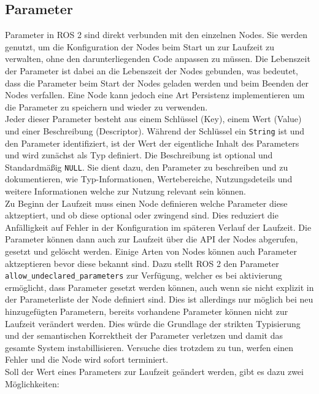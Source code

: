 \subsection{Parameter}\label{subsec:ROS2Parameter}
Parameter in \ac{ROS} 2 sind direkt verbunden mit den einzelnen Nodes. Sie werden genutzt, um die Konfiguration der Nodes beim Start un zur Laufzeit zu verwalten, ohne den darunterliegenden Code anpassen zu müssen. Die Lebenszeit der Parameter ist dabei an die Lebenszeit der Nodes gebunden, was bedeutet, dass die Parameter beim Start der Nodes geladen werden und beim Beenden der Nodes verfallen. Eine Node kann jedoch eine Art Persistenz implementieren um die Parameter zu speichern und wieder zu verwenden.\\
Jeder dieser Parameter besteht aus einem Schlüssel (Key), einem Wert (Value) und einer Beschreibung (Descriptor). Während der Schlüssel ein \texttt{String} ist und den Parameter identifiziert, ist der Wert der eigentliche Inhalt des Parameters und wird zunächst als Typ definiert. Die Beschreibung ist optional und Standardmäßig \texttt{NULL}. Sie dient dazu, den Parameter zu beschreiben und zu dokumentieren, wie Typ-Informationen, Wertebereiche, Nutzungsdeteils und weitere Informationen welche zur Nutzung relevant sein können.\\
Zu Beginn der Laufzeit muss einen Node definieren welche Parameter diese aktzeptiert, und ob diese optional oder zwingend sind. Dies reduziert die Anfälligkeit auf Fehler in der Konfiguration im späteren Verlauf der Laufzeit. Die Parameter können dann auch zur Laufzeit über die \ac{API} der Nodes abgerufen, gesetzt und gelöscht werden. Einige Arten von Nodes können auch Parameter aktzeptieren bevor diese bekannt sind. Dazu stellt \ac{ROS} 2 den Parameter \texttt{allow\_undeclared\_parameters} zur Verfügung, welcher es bei aktivierung ermöglicht, dass Parameter gesetzt werden können, auch wenn sie nicht explizit in der Parameterliste der Node definiert sind. Dies ist allerdings nur möglich bei neu hinzugefügten Parametern, bereits vorhandene Parameter können nicht zur Laufzeit verändert werden. Dies würde die Grundlage der strikten Typisierung und der semantischen Korrektheit der Parameter verletzen und damit das gesamte System instabillisieren. Versuche dies trotzdem zu tun, werfen einen Fehler und die Node wird sofort terminiert.\\
Soll der Wert eines Parameters zur Laufzeit geändert werden, gibt es dazu zwei Möglichkeiten:\\

